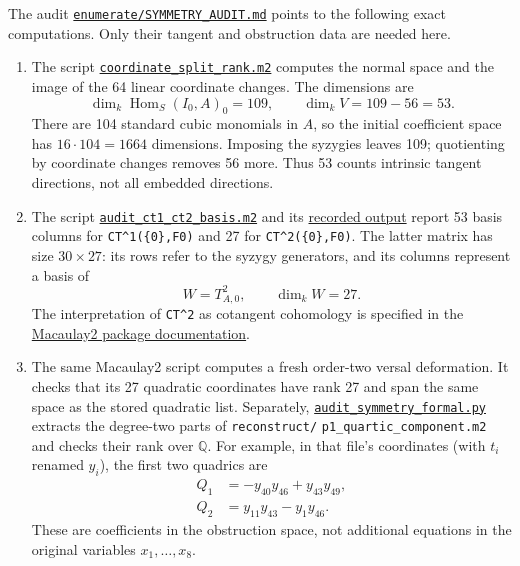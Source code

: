 The audit
\href{https://github.com/danimalabares/%
grunbaum-zero-context-proof/blob/%
ee984e9541e9cb9259728e6dc7b3a1bc0fda8a9b/%
enumerate/SYMMETRY_AUDIT.md}
{\texttt{enumerate/SYMMETRY\_AUDIT.md}}
points to the following exact computations.
Only their tangent and obstruction data
are needed here.
\begin{enumerate}
\item The script
\href{https://github.com/danimalabares/%
grunbaum-zero-context-proof/blob/%
ee984e9541e9cb9259728e6dc7b3a1bc0fda8a9b/%
reconstruct/coordinate_split_rank.m2}
{\texttt{coordinate\_split\_rank.m2}}
computes the normal space and the image
of the 64 linear coordinate changes.
The dimensions are
$$
\dim_k\operatorname{Hom}_S(I_0,A)_0=109,
\qquad \dim_k V=109-56=53.
$$
There are 104 standard cubic monomials in
$A$, so the initial coefficient space has
$16\cdot104=1664$ dimensions. Imposing
the syzygies leaves 109; quotienting by
coordinate changes removes 56 more.
Thus 53 counts intrinsic tangent
directions, not all embedded directions.

\item The script
\href{https://github.com/danimalabares/%
grunbaum-zero-context-proof/blob/%
ee984e9541e9cb9259728e6dc7b3a1bc0fda8a9b/%
reconstruct/audit_ct1_ct2_basis.m2}
{\texttt{audit\_ct1\_ct2\_basis.m2}}
and its
\href{https://github.com/danimalabares/%
grunbaum-zero-context-proof/blob/%
ee984e9541e9cb9259728e6dc7b3a1bc0fda8a9b/%
reconstruct/audit_ct1_ct2_basis_output.txt}
{recorded output} report 53 basis columns
for \texttt{CT\^{}1(\{0\},F0)} and 27
for \texttt{CT\^{}2(\{0\},F0)}.
The latter matrix has size $30\times27$:
its rows refer to the syzygy generators,
and its columns represent a basis of
$$
W=T^2_{A,0},\qquad \dim_k W=27.
$$
The interpretation of \texttt{CT\^{}2}
as cotangent cohomology is specified in
the \href{https://macaulay2.com/doc/%
Macaulay2/share/doc/Macaulay2/%
VersalDeformations/html/___C__T.html}
{Macaulay2 package documentation}.

\item The same Macaulay2 script computes
a fresh order-two versal deformation.
It checks that its 27 quadratic
coordinates have rank 27 and span the
same space as the stored quadratic list.
Separately,
\href{https://github.com/danimalabares/%
grunbaum-zero-context-proof/blob/%
ee984e9541e9cb9259728e6dc7b3a1bc0fda8a9b/%
enumerate/audit_symmetry_formal.py}
{\texttt{audit\_symmetry\_formal.py}}
extracts the degree-two parts of
\texttt{reconstruct/}%
\texttt{p1\_quartic\_component.m2}
and checks their rank over $\mathbb{Q}$.
For example, in that file's coordinates
(with $t_i$ renamed $y_i$), the first two
quadrics are
$$
\begin{aligned}
Q_1&=-y_{40}y_{46}+y_{43}y_{49},\\
Q_2&=y_{11}y_{43}-y_1y_{46}.
\end{aligned}
$$
These are coefficients in the obstruction
space, not additional equations in the
original variables $x_1,\ldots,x_8$.
\end{enumerate}

